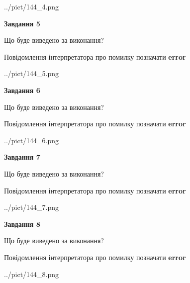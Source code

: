 \documentclass[12pt, ukrainian]{article}
\begin{document}
{\begin{center}
	{../pict/144_4.png}
\end{center}
\newpage

{\begin {center}\textbf{Завдання 5}\end {center}}\par
Що буде виведено за виконання? \par
Повідомлення інтерпретатора про помилку позначати \textbf{error}

\begin{center}
	{../pict/144_5.png}
\end{center}
\newpage

{\begin {center}\textbf{Завдання 6}\end {center}}\par
Що буде виведено за виконання? \par
Повідомлення інтерпретатора про помилку позначати \textbf{error}

\begin{center}
	{../pict/144_6.png}
\end{center}
\newpage

{\begin {center}\textbf{Завдання 7}\end {center}}\par
Що буде виведено за виконання? \par
Повідомлення інтерпретатора про помилку позначати \textbf{error}

\begin{center}
	{../pict/144_7.png}
\end{center}
\newpage

{\begin {center}\textbf{Завдання 8}\end {center}}\par
Що буде виведено за виконання? \par
Повідомлення інтерпретатора про помилку позначати \textbf{error}

\begin{center}
	{../pict/144_8.png}
\end{center}
\newpage

}
\end{document}
